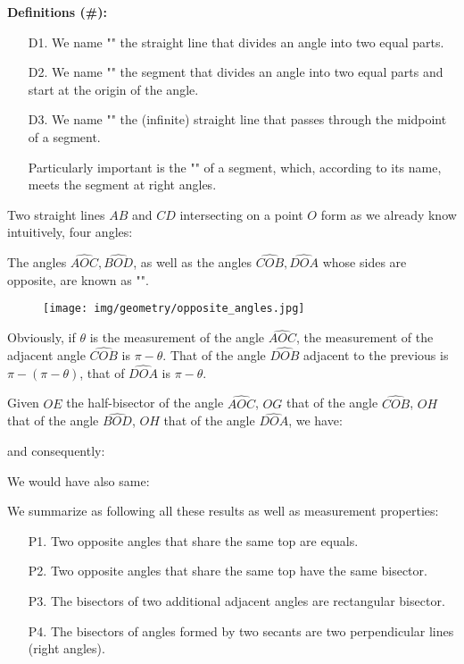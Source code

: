 	\textbf{Definitions (\#\mydef):}
	\begin{enumerate}
		\item[D1.] We name "" the straight line that divides an angle into two equal parts.

		\item[D2.] We name ""  the segment that divides an angle into two equal parts and start at the origin of the angle.

		\item[D3.] We name "" the (infinite) straight line that passes through the midpoint of a segment.

		Particularly important is the "" of a segment, which, according to its name, meets the segment at right angles. 
	\end{enumerate}
	
	Two straight lines $AB$ and $CD$ intersecting on a point $O$ form as we already know intuitively, four angles:
	
	The angles $\widehat{AOC},\widehat{BOD}$, as well as the angles $\widehat{COB},\widehat{DOA}$ whose sides are opposite, are known as "".
	\begin{figure}[H]
		\centering
		\texttt{[image: img/geometry/opposite\_angles.jpg]}
	\end{figure}
	Obviously, if $\theta$ is the measurement of the angle $\widehat{AOC}$, the measurement of the adjacent angle $\widehat{COB}$ is $\pi-\theta$. That of the angle $\widehat{DOB}$ adjacent to the previous is $\pi-(\pi-\theta)$, that of $\widehat{DOA}$ is $\pi-\theta$.
	
	Given $OE$ the half-bisector of the angle $\widehat{AOC}$, $OG$ that of the angle $\widehat{COB}$, $OH$ that of the angle $\widehat{BOD}$, $OH$ that of the angle $\widehat{DOA}$, we have:
	
	and consequently:
	
	We would have also same:
	
	We summarize as following all these results as well as measurement properties:
	\begin{enumerate}
		\item[P1.] Two opposite angles that share the same top are equals.
		\item[P2.] Two opposite angles that share the same top have the same bisector.
		\item[P3.] The bisectors of two additional adjacent angles are rectangular bisector.
		\item[P4.] The bisectors of angles formed by two secants are two perpendicular lines (right angles).
	\end{enumerate}
	
